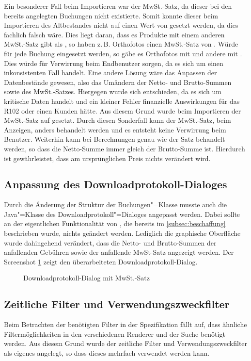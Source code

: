 Ein besonderer Fall beim Importieren war der MwSt.-Satz, da dieser bei den bereits angelegten Buchungen nicht existierte.
Somit konnte dieser beim Importieren des Altbestandes nicht auf einen Wert von  gesetzt werden, da dies fachlich falsch wäre.
Dies liegt daran, dass es Produkte mit einem anderen MwSt.-Satz gibt als , so haben z.\,B. Orthofotos einen MwSt.-Satz von .
Würde für jede Buchung  eingesetzt werden, so gäbe es Orthofotos mit  und andere mit .
Dies würde für Verwirrung beim Endbenutzer sorgen, da es sich um einen inkonsistenten Fall handelt.
Eine andere Lösung wäre das Anpassen der Datenbestände gewesen, also das Umändern der Netto- und Brutto-Summen sowie des MwSt.-Satzes. 
Hiergegen wurde sich entschieden, da es sich um kritische Daten handelt und ein kleiner Fehler finanzielle Auswirkungen für das R102 oder einen Kunden hätte.
Aus diesem Grund wurde beim Importieren der MwSt.-Satz auf  gesetzt.
Durch diesen Sonderfall kann der MwSt.-Satz, beim Anzeigen, anders behandelt werden und es entsteht keine Verwirrung beim Benutzer.
Weiterhin kann bei Berechnungen  genau wie der Satz  behandelt werden, so dass die Netto-Summe immer gleich der Brutto-Summe ist.
Hierdurch ist gewährleistet, dass am ursprünglichen Preis nichts verändert wird.


\subsection{Anpassung des Downloadprotokoll-Dialoges}
Durch die Änderung der Struktur der Buchungen"=Klasse musste auch die Java"=Klasse des Downloadprotokoll"=Dialoges  angepasst werden.
Dabei sollte an der eigentlichen Funktionalität von , die bereits im \autoref{subsec:beschaffung} beschrieben wurde, nichts geändert werden.
Lediglich die graphische Oberfläche wurde dahingehend verändert, dass die Netto- und Brutto-Summen der anfallenden Gebühren sowie der anfallende MwSt-Satz angezeigt werden.
Der Screenshot \ref{fig:alkis-protocol-new} zeigt den überarbeiteten Downloadprotokoll-Dialog.

\begin{figure}[htb]
	\centering
	\caption{Downloadprotokoll-Dialog mit MwSt.-Satz}
	\label{fig:alkis-protocol-new}
\end{figure}

\subsection{Zeitliche Filter und Verwendungszweckfilter}
Beim Betrachten der benötigten Filter in der Spezifikation fällt auf, dass ähnliche Filtermöglichkeiten in den verschiedenen Renderer und der Suche benötigt werden. Aus diesem Grund wurde der zeitliche Filter und Verwendungszweckfilter als eigenes  angelegt, so dass dieses mehrfach verwendet werden kann.

